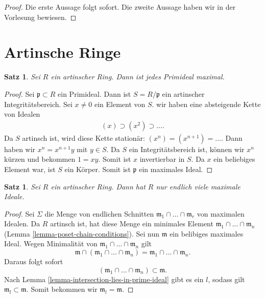 \documentclass[reqno,12pt]{article}
\numberwithin{equation}{section}
\theoremstyle{plain}
\newtheorem{proposition}[thm]{Satz}
\theoremstyle{definition}
\begin{document}
\begin{proof}
  Die erste Aussage folgt sofort. Die zweite Aussage haben wir in der Vorlesung bewiesen.
\end{proof}

\newpage
\section{Artinsche Ringe}

\begin{proposition}\label{proposition-artinian-primes-are-maximal}
Sei $R$ ein artinscher Ring. Dann ist jedes Primideal maximal.
\end{proposition}

\begin{proof}
Sei $\mathfrak{p} \subset R$ ein Primideal. Dann ist $S = R/\mathfrak{p}$ ein artinscher Integritätsbereich. Sei $x \neq 0$ ein Element von $S$. wir haben eine absteigende Kette von Idealen
\begin{align*}
(x) \supset (x^2) \supset \dots.
\end{align*}
Da $S$ artinsch ist, wird diese Kette stationär: $(x^n) = (x^{n+1}) = \dots $. Dann haben wir $x^n = x^{n+1} y$ mit $y \in S$. Da $S$ ein Integritätsbereich ist, können wir $x^n$ kürzen und bekommen $1= xy$. Somit ist $x$ invertierbar in $S$. Da $x$ ein beliebiges Element war, ist $S$ ein Körper. Somit ist $\mathfrak{p}$ ein maximales Ideal.
\end{proof}


\begin{proposition}\label{proposition-artinian-finite-number-maximal}
Sei $R$ ein artinscher Ring. Dann hat $R$ nur endlich viele maximale Ideale.
\end{proposition}

\begin{proof}
Sei $\Sigma$ die Menge von endlichen Schnitten $\mathfrak{m}_1 \cap \dots \cap \mathfrak{m}_r$ von maximalen Idealen. Da $R$ artinsch ist, hat diese Menge ein minimales Element $\mathfrak{m}_1 \cap \dots \cap \mathfrak{m}_n$ (Lemma \ref{lemma-poset-chain-conditions}). Sei nun  $\mathfrak{m}$
ein belibiges maximales Ideal. Wegen Minimalität von $\mathfrak{m}_1 \cap \dots \cap \mathfrak{m}_n$ gilt
$$
\mathfrak{m} \cap (\mathfrak{m}_1 \cap \dots \cap \mathfrak{m}_n) = \mathfrak{m}_1 \cap \dots \cap \mathfrak{m}_n.
$$
Daraus folgt sofort
$$
(\mathfrak{m}_1 \cap \dots \cap \mathfrak{m}_n) \subset \mathfrak{m}.
$$
Nach Lemma \ref{lemma-intersection-lies-in-prime-ideal} gibt es ein $l$, sodass gilt $\mathfrak{m}_l \subset \mathfrak{m}$. Somit bekommen wir $\mathfrak{m}_l = \mathfrak{m}$.
\end{proof}
\end{document}
